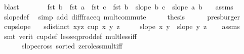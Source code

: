 \begin{isabellebody}
\ blast\isanewline
\ \ \isamarkupfalse%
\ \isamarkupfalse%
\ {\isachardoublequoteopen}{\isachardot}{\kern0pt}{\isachardot}{\kern0pt}{\isachardot}{\kern0pt}\ {\isacharequal}{\kern0pt}\ {\isacharparenleft}{\kern0pt}fst\ b\ {\isacharminus}{\kern0pt}\ fst\ a{\isacharparenright}{\kern0pt}\ {\isacharasterisk}{\kern0pt}\ {\isacharparenleft}{\kern0pt}fst\ c\ {\isacharminus}{\kern0pt}\ fst\ b{\isacharparenright}{\kern0pt}\ {\isacharasterisk}{\kern0pt}\ {\isacharparenleft}{\kern0pt}slope\ b\ c\ {\isacharminus}{\kern0pt}\ slope\ a\ b{\isacharparenright}{\kern0pt}{\isachardoublequoteclose}\ \isamarkupfalse%
\ {}\ assms\ \isamarkupfalse%
\ slope{\isacharunderscore}{\kern0pt}def\ \isamarkupfalse%
\ {\isacharparenleft}{\kern0pt}simp\ add{\isacharcolon}{\kern0pt}\ diff{\isacharunderscore}{\kern0pt}frac{\isacharunderscore}{\kern0pt}eq\ mult{\isachardot}{\kern0pt}commute{\isacharparenright}{\kern0pt}\isanewline
\ \ \isamarkupfalse%
\ \isamarkupfalse%
\ {\isacharquery}{\kern0pt}thesis\isanewline
\ \ \ \ \isamarkupfalse%
\ presburger\isanewline
{}\isamarkupfalse%
%
\endisatagproof
{\isafoldproof}%
%
\isadelimproof
\isanewline
%
\endisadelimproof
\isanewline
{}\isamarkupfalse%
\ cup{}{\isacharunderscore}{\kern0pt}slope{\isacharcolon}{\kern0pt}\isanewline
\ \ \ {\isachardoublequoteopen}sdistinct\ {\isacharbrackleft}{\kern0pt}x{\isacharcomma}{\kern0pt}y{\isacharcomma}{\kern0pt}z{\isacharbrackright}{\kern0pt}{\isachardoublequoteclose}\ {\isachardoublequoteopen}cup{}\ x\ y\ z{\isachardoublequoteclose}\isanewline
\ \ \ \ \ {\isachardoublequoteopen}slope\ x\ y\ {\isacharless}{\kern0pt}\ slope\ y\ z{\isachardoublequoteclose}\isanewline
%
\isadelimproof
\ \ %
\endisadelimproof
%
\isatagproof
{}\isamarkupfalse%
\ assms\isanewline
\ \ \isamarkupfalse%
\ {\isacharparenleft}{\kern0pt}smt\ {\isacharparenleft}{\kern0pt}verit{\isacharparenright}{\kern0pt}\ cup{}{\isacharunderscore}{\kern0pt}def\ less{\isacharunderscore}{\kern0pt}eq{\isacharunderscore}{\kern0pt}prod{\isacharunderscore}{\kern0pt}def\ mult{\isacharunderscore}{\kern0pt}less{\isacharunderscore}{\kern0pt}{}{\isacharunderscore}{\kern0pt}iff\isanewline
\ \ \ \ \ \ slope{\isacharunderscore}{\kern0pt}cross{}\ sorted{}\ zero{\isacharunderscore}{\kern0pt}less{\isacharunderscore}{\kern0pt}mult{\isacharunderscore}{\kern0pt}iff{\isacharparenright}{\kern0pt}%

\end{isabellebody}
